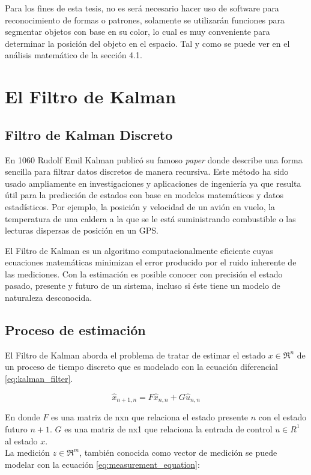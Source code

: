 Para los fines de esta tesis, no es será necesario hacer uso de software para reconocimiento de formas o patrones, solamente se utilizarán funciones para segmentar objetos con base en su color, lo cual es muy conveniente para determinar la posición del objeto en el espacio. Tal y como se puede ver en el análisis matemático de la sección 4.1.
	
	\section{El Filtro de Kalman}
		\subsection*{Filtro de Kalman Discreto}
	En 1060 Rudolf Emil Kalman publicó su famoso \textit{paper} donde describe una forma sencilla para filtrar datos discretos de manera recursiva. Este método ha sido usado ampliamente en investigaciones y aplicaciones de ingeniería ya que resulta útil para la predicción de estados con base en modelos matemáticos y datos estadísticos. Por ejemplo, la posición y velocidad de un avión en vuelo, la temperatura de una caldera a la que se le está suministrando combustible o las lecturas dispersas de posición en un GPS.

	El Filtro de Kalman es un algoritmo computacionalmente eficiente cuyas ecuaciones matemáticas minimizan el error producido por el ruido inherente de las mediciones. Con la estimación es posible conocer con precisión el estado pasado, presente y futuro de un sistema, incluso si éste tiene un modelo de naturaleza desconocida.
	
		\subsection*{Proceso de estimación}
		El Filtro de Kalman aborda el problema de tratar de estimar el estado $x \in \Re^n$ de un proceso de tiempo discreto que es modelado con la ecuación diferencial \ref{eq:kalman_filter}.
		
\begin{equation}
\hat{x}_{n+1,n} = F \hat{x}_{n,n} + G \hat{u}_{n,n}
\label{eq:kalman_filter}
\end{equation}

	En donde $F$ es una matriz de nxn que relaciona el estado presente $n$ con el estado futuro $n+1$. $G$ es una matriz de nx1 que relaciona la entrada de control $u \in R^1$ al estado $x$. 
\\
	La medición $z \in \Re^m$, también conocida como vector de medición se puede modelar con la ecuación \ref{eq:measurement_equation}:

